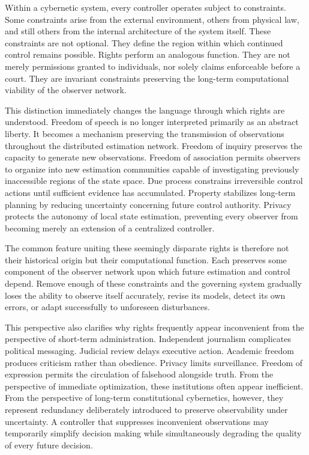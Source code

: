 \documentclass[12pt,a4paper]{article}
\begin{document}
Within a cybernetic system, every controller operates subject to constraints. Some constraints arise from the external environment, others from physical law, and still others from the internal architecture of the system itself. These constraints are not optional. They define the region within which continued control remains possible. Rights perform an analogous function. They are not merely permissions granted to individuals, nor solely claims enforceable before a court. They are invariant constraints preserving the long-term computational viability of the observer network.

This distinction immediately changes the language through which rights are understood. Freedom of speech is no longer interpreted primarily as an abstract liberty. It becomes a mechanism preserving the transmission of observations throughout the distributed estimation network. Freedom of inquiry preserves the capacity to generate new observations. Freedom of association permits observers to organize into new estimation communities capable of investigating previously inaccessible regions of the state space. Due process constrains irreversible control actions until sufficient evidence has accumulated. Property stabilizes long-term planning by reducing uncertainty concerning future control authority. Privacy protects the autonomy of local state estimation, preventing every observer from becoming merely an extension of a centralized controller.

The common feature uniting these seemingly disparate rights is therefore not their historical origin but their computational function. Each preserves some component of the observer network upon which future estimation and control depend. Remove enough of these constraints and the governing system gradually loses the ability to observe itself accurately, revise its models, detect its own errors, or adapt successfully to unforeseen disturbances.

This perspective also clarifies why rights frequently appear inconvenient from the perspective of short-term administration. Independent journalism complicates political messaging. Judicial review delays executive action. Academic freedom produces criticism rather than obedience. Privacy limits surveillance. Freedom of expression permits the circulation of falsehood alongside truth. From the perspective of immediate optimization, these institutions often appear inefficient. From the perspective of long-term constitutional cybernetics, however, they represent redundancy deliberately introduced to preserve observability under uncertainty. A controller that suppresses inconvenient observations may temporarily simplify decision making while simultaneously degrading the quality of every future decision.
\end{document}
